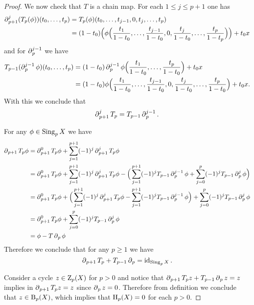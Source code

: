 \begin{proof}
    We now check that \(T\) is a chain map. For each
    \(1 \leq j \leq p+1\) one has
    \begin{align*}
        \operatorname{\partial}_{p+1}^j (T_p(\phi))(t_0, \dots, t_p)
         & = T_p(\phi)(t_0, \dots, t_{j-1}, 0, t_j, \dots, t_p) \\
         & = (1 - t_0) \Big(
        \phi\Big(
            \frac{t_{1}}{1 - t_{0}}, \dots, \frac{t_{j-1}}{1 - t_0}, 0,
            \frac{t_{j}}{1 - t_0}, \dots, \frac{t_{p}}{1 - t_{p}}
            \Big)
        \Big) + t_0 x
    \end{align*}
    and for \(\operatorname{\partial}_p^{j-1}\) we have
    \begin{align*}
        T_{p-1}(\operatorname{\partial}_p^{j-1} \phi)(t_0, \dots, t_{p})
         & = (1 - t_0) \operatorname{\partial}_p^{j-1} \phi\Big(
        \frac{t_{1}}{1 - t_0}, \dots, \frac{t_{p}}{1 - t_{0}}
        \Big) + t_0 x                          \\
         & = (1 - t_0) \phi\Big(
        \frac{t_{1}}{1 - t_{0}}, \dots, \frac{t_{j-1}}{1 - t_{0}}, 0,
        \frac{t_j}{1 - t_0}, \dots, \frac{t_{p}}{1 - t_0}
        \Big) + t_0 x.
    \end{align*}
    With this we conclude that
    \[
        \operatorname{\partial}_{p+1}^j T_p = T_{p-1} \operatorname{\partial}_p^{j-1}.
    \]

    For any \(\phi \in \operatorname{Sing}_p X\) we have
    \begin{align*}
        \operatorname{\partial}_{p+1} T_p \phi
         & = \operatorname{\partial}_{p+1}^0 T_p \phi + \sum_{j=1}^{p+1} (-1)^j \operatorname{\partial}_{p+1}^j T_p \phi \\
         & = \operatorname{\partial}_{p+1}^0 T_p \phi + \sum_{j=1}^{p+1} (-1)^j \operatorname{\partial}_{p+1}^j T_p \phi
        - \Big(
        \sum_{j=1}^{p+1} (-1)^j T_{p-1} \operatorname{\partial}_p^{j-1} \phi
        + \sum_{j=0}^p (-1)^j T_{p-1} \operatorname{\partial}_p^j \phi
        \Big)                                                                        \\
         & = \operatorname{\partial}_{p+1}^0 T_p \phi + \Big(
        \sum_{j=1}^{p+1} (-1)^j \operatorname{\partial}_{p+1}^j T_p \phi
        - \sum_{j=1}^{p+1} (-1)^j T_{p-1} \operatorname{\partial}_p^{j-1} \phi
        \Big) + \sum_{j=0}^p (-1)^j T_{p-1} \operatorname{\partial}_p^j \phi                           \\
         & = \operatorname{\partial}_{p+1}^0 T_p \phi + \sum_{j=0}^p (-1)^j T_{p-1} \operatorname{\partial}_p^j \phi     \\
         & = \phi - T \operatorname{\partial}_p \phi
    \end{align*}
    Therefore we conclude that for any \(p \geq 1\) we have
    \[
        \operatorname{\partial}_{p+1} T_p + T_{p-1} \operatorname{\partial}_p = \operatorname{id}_{\operatorname{Sing}_p X}.
    \]

    Consider a cycle \(z \in \operatorname{Z}_p(X)\) for \(p > 0\) and notice that
    \(\operatorname{\partial}_{p+1} T_p z + T_{p-1} \operatorname{\partial}_p z = z\) implies in
    \(\operatorname{\partial}_{p+1} T_p z = z\) since \(\operatorname{\partial}_p z = 0\). Therefore from definition we
    conclude that \(z \in \operatorname{B}_p(X)\), which implies that \(\operatorname{H}_p(X) = 0\) for each
    \(p > 0\).
\end{proof}

